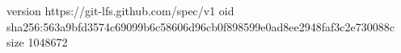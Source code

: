 version https://git-lfs.github.com/spec/v1
oid sha256:563a9bfd3574c69099b6c58606d96cb0f898599e0ad8ee2948faf3c2e730088c
size 1048672
